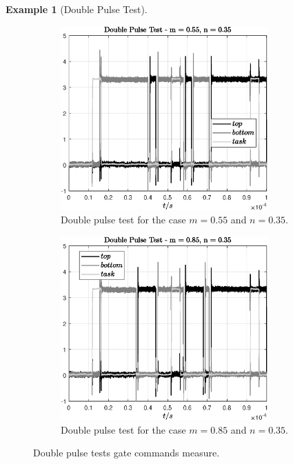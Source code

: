 \documentclass[11pt,a4paper,oneside]{book}
\numberwithin{equation}{section}
\theoremstyle{it}
\theoremstyle{definition}
\newtheorem{example}{Example}[section]
\begin{document}
\begin{example}[Double Pulse Test]
	\begin{figure}[H]
		\centering
		\begin{subfigure}{.5\textwidth}
			\centering
			\includegraphics[width = 225pt, angle = 0, 
			keepaspectratio]{figures/double_pulse_test/measure_case_m055_n035.eps}
			\captionsetup{width=0.5\textwidth, font=small}	
			\caption{Double pulse test for the case $m = 0.55$ and $n = 0.35$.}
			\label{}
		\end{subfigure}%
		\begin{subfigure}{.5\textwidth}
			\centering
			\includegraphics[width = 225pt, angle = 0, 
			keepaspectratio]{figures/double_pulse_test/measure_case_m085_n035.eps}
			\captionsetup{width=0.5\textwidth, font=small}	
			\caption{Double pulse test for the case $m = 0.85$ and $n = 0.35$.}
			\label{}
		\end{subfigure}
		\captionsetup{width=0.5\textwidth, font=small}
		\caption{Double pulse tests gate commands measure.}
		\label{}
	\end{figure}
	

\end{example}
\end{document}
